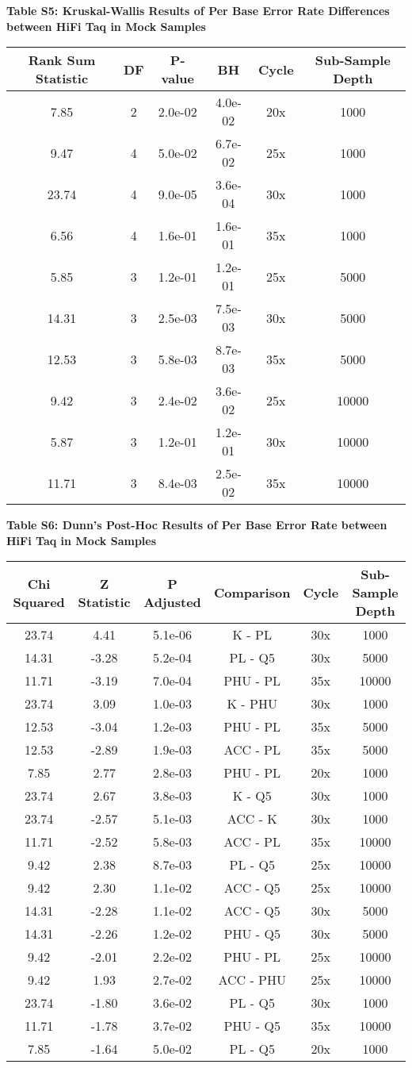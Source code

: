 \documentclass[12pt,]{article}
\begin{document}
\newpage

\textbf{Table S5: Kruskal-Wallis Results of Per Base Error Rate
Differences between HiFi Taq in Mock Samples}

\begin{longtable}[]{@{}cccccc@{}}
\toprule
Rank Sum Statistic & DF & P-value & BH & Cycle & Sub-Sample
Depth\tabularnewline
\midrule
\endhead
7.85 & 2 & 2.0e-02 & 4.0e-02 & 20x & 1000\tabularnewline
9.47 & 4 & 5.0e-02 & 6.7e-02 & 25x & 1000\tabularnewline
23.74 & 4 & 9.0e-05 & 3.6e-04 & 30x & 1000\tabularnewline
6.56 & 4 & 1.6e-01 & 1.6e-01 & 35x & 1000\tabularnewline
5.85 & 3 & 1.2e-01 & 1.2e-01 & 25x & 5000\tabularnewline
14.31 & 3 & 2.5e-03 & 7.5e-03 & 30x & 5000\tabularnewline
12.53 & 3 & 5.8e-03 & 8.7e-03 & 35x & 5000\tabularnewline
9.42 & 3 & 2.4e-02 & 3.6e-02 & 25x & 10000\tabularnewline
5.87 & 3 & 1.2e-01 & 1.2e-01 & 30x & 10000\tabularnewline
11.71 & 3 & 8.4e-03 & 2.5e-02 & 35x & 10000\tabularnewline
\bottomrule
\end{longtable}

\newpage

\textbf{Table S6: Dunn's Post-Hoc Results of Per Base Error Rate between
HiFi Taq in Mock Samples}

\begin{longtable}[]{@{}cccccc@{}}
\toprule
Chi Squared & Z Statistic & P Adjusted & Comparison & Cycle & Sub-Sample
Depth\tabularnewline
\midrule
\endhead
23.74 & 4.41 & 5.1e-06 & K - PL & 30x & 1000\tabularnewline
14.31 & -3.28 & 5.2e-04 & PL - Q5 & 30x & 5000\tabularnewline
11.71 & -3.19 & 7.0e-04 & PHU - PL & 35x & 10000\tabularnewline
23.74 & 3.09 & 1.0e-03 & K - PHU & 30x & 1000\tabularnewline
12.53 & -3.04 & 1.2e-03 & PHU - PL & 35x & 5000\tabularnewline
12.53 & -2.89 & 1.9e-03 & ACC - PL & 35x & 5000\tabularnewline
7.85 & 2.77 & 2.8e-03 & PHU - PL & 20x & 1000\tabularnewline
23.74 & 2.67 & 3.8e-03 & K - Q5 & 30x & 1000\tabularnewline
23.74 & -2.57 & 5.1e-03 & ACC - K & 30x & 1000\tabularnewline
11.71 & -2.52 & 5.8e-03 & ACC - PL & 35x & 10000\tabularnewline
9.42 & 2.38 & 8.7e-03 & PL - Q5 & 25x & 10000\tabularnewline
9.42 & 2.30 & 1.1e-02 & ACC - Q5 & 25x & 10000\tabularnewline
14.31 & -2.28 & 1.1e-02 & ACC - Q5 & 30x & 5000\tabularnewline
14.31 & -2.26 & 1.2e-02 & PHU - Q5 & 30x & 5000\tabularnewline
9.42 & -2.01 & 2.2e-02 & PHU - PL & 25x & 10000\tabularnewline
9.42 & 1.93 & 2.7e-02 & ACC - PHU & 25x & 10000\tabularnewline
23.74 & -1.80 & 3.6e-02 & PL - Q5 & 30x & 1000\tabularnewline
11.71 & -1.78 & 3.7e-02 & PHU - Q5 & 35x & 10000\tabularnewline
7.85 & -1.64 & 5.0e-02 & PL - Q5 & 20x & 1000\tabularnewline
\bottomrule
\end{longtable}
\end{document}
